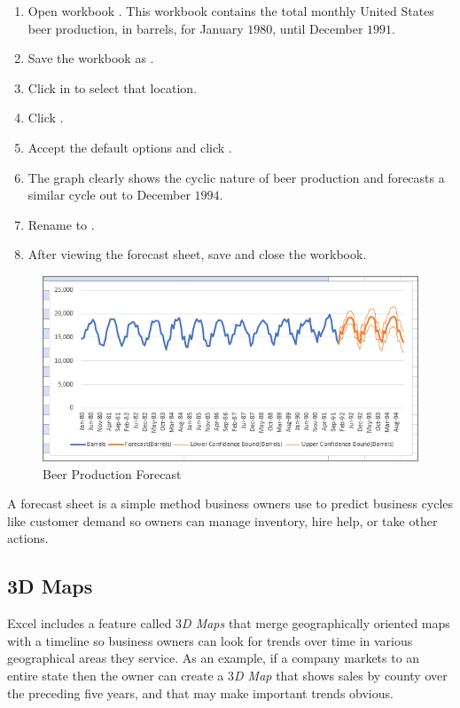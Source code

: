 \begin{enumerate}
	\item Open workbook . This workbook contains the total monthly United States beer production, in barrels, for January $ 1980 $, until December $ 1991 $. 
	\item Save the workbook as .
	\item Click in  to select that location.
	\item Click .
	\item Accept the default options and click .
	\item The graph clearly shows the cyclic nature of beer production and forecasts a similar cycle out to December $ 1994 $.
	\item Rename  to .
	\item After viewing the forecast sheet, save and close the  workbook.
\end{enumerate}

\begin{figure}[H]
	\centering
	\includegraphics[width=\maxwidth{.95\linewidth}]{gfx/ch08_fig13}
	\caption{Beer Production Forecast}
	\label{08:fig13}
\end{figure}

A forecast sheet is a simple method business owners use to predict business cycles like customer demand so owners can manage inventory, hire help, or take other actions.

\subsection{3D Maps}

Excel includes a feature called \textit{$ 3 $D Maps} that merge geographically oriented maps with a timeline so business owners can look for trends over time in various geographical areas they service. As an example, if a company markets to an entire state then the owner can create a \textit{$ 3 $D Map} that shows sales by county over the preceding five years, and that may make important trends obvious.

